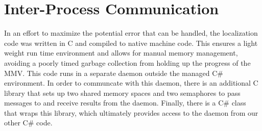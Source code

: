 \section{Inter-Process Communication}
In an effort to maximize the potential error that can be handled, the localization code was written in C and compiled to native machine code.  This ensures a light weight run time environment and allows for manual memory management, avoiding a poorly timed garbage collection from holding up the progress of the MMV.  This code runs in a separate daemon outside the managed C\# environment.  In order to communcate with this daemon, there is an additional C library that sets up two shared memory spaces and two semaphores to pass messages to and receive results from the daemon.  Finally, there is a C\# class that wraps this library, which ultimately provides access to the daemon from our other C\# code.
